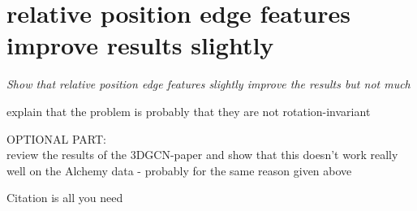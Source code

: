 \section{relative position edge features improve results slightly}

{\itshape
 Show that relative position edge features slightly improve the results but not much
 
 explain that the problem is probably that they are not rotation-invariant
	
	
OPTIONAL PART:\\
review the results of the 3DGCN-paper and show that this doesn't work really well on the Alchemy data - probably for the same reason given above
}

Citation is all you need~\cite{Vaswani2017}

